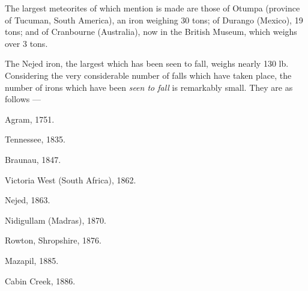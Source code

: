 \documentclass[a4paper, 12pt, oneside, polutonikogreek, english]{article}
\begin{document}
The largest meteorites of which mention is made are those of Otumpa (province of Tucuman, South America), an iron weighing 30 tons; of Durango (Mexico), 19 tons; and of Cranbourne (Australia), now in the British Museum, which weighs over 3 tons.

The Nejed iron, the largest which has been seen to fall, weighs nearly 130 lb. Considering the very considerable number of falls which have taken place, the number of irons which have been \emph{seen to fall} is remarkably small. They are as follows ---

Agram, 1751.

Tennessee, 1835.

Braunau, 1847.

Victoria West (South Africa), 1862.

Nejed, 1863.

Nidigullam (Madras), 1870.

Rowton, Shropshire, 1876.

Mazapil, 1885.

Cabin Creek, 1886.
\end{document}
